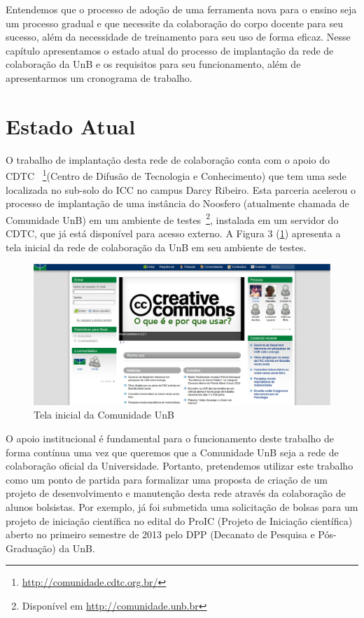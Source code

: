 Entendemos que o processo de adoção de uma ferramenta nova para o ensino seja
um processo gradual e que necessite da colaboração do corpo docente para seu
sucesso, além da necessidade de treinamento para seu uso de forma eficaz.
Nesse capítulo apresentamos o estado atual do processo de implantação da rede
de colaboração da UnB e os requisitos para seu funcionamento, além de
apresentarmos um cronograma de trabalho.


\section{Estado Atual}

O trabalho de implantação desta rede de colaboração conta com o apoio do \\ CDTC
~\footnote{\url{http://comunidade.cdtc.org.br/}}(Centro de Difusão de Tecnologia
e Conhecimento) que tem uma sede localizada no sub-solo do ICC no campus Darcy
Ribeiro. Esta parceria acelerou o processo de implantação de uma instância do
Noosfero (atualmente chamada de Comunidade UnB) em um ambiente de
testes~\footnote{Disponível em \url{http://comunidade.unb.br}}, instalada em um
servidor do CDTC, que já está disponível para acesso externo. A Figura 3
(\ref{comunidade-unb}) apresenta a tela inicial da rede de colaboração da UnB
em seu ambiente de testes.

\begin{figure}[h]
	\centering
	\label{comunidade-unb}
		\includegraphics[keepaspectratio=true,scale=0.3]
		{figuras/comunidade.unb.br.eps}
	\caption{Tela inicial da Comunidade UnB}
\end{figure}

O apoio institucional é fundamental para o funcionamento deste trabalho de forma
contínua uma vez que queremos que a Comunidade UnB seja a rede de colaboração
oficial da Universidade. Portanto, pretendemos utilizar este trabalho como um
ponto de partida para formalizar uma proposta de criação de um projeto de
desenvolvimento e manutenção desta rede através da colaboração de alunos
bolsistas. Por exemplo, já foi submetida uma solicitação de bolsas para um projeto
de iniciação científica no edital do ProIC (Projeto de Iniciação científica)
aberto no primeiro semestre de 2013 pelo DPP (Decanato de Pesquisa e Pós-
Graduação) da UnB.

